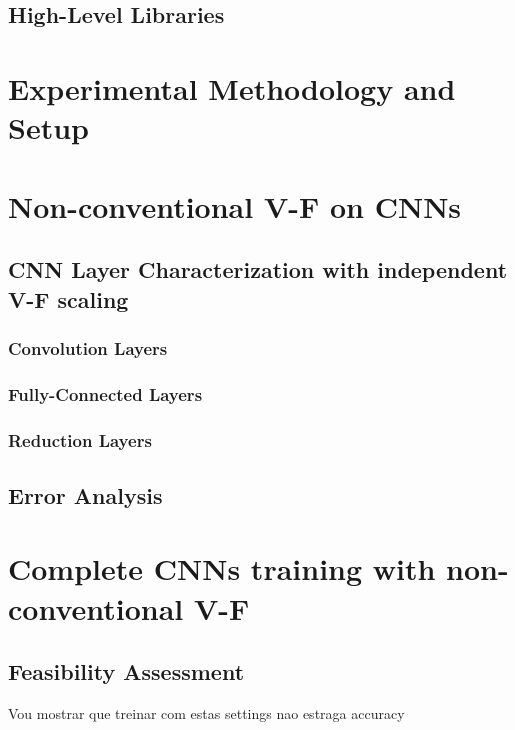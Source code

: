\subsection{High-Level Libraries}

\section{Experimental Methodology and Setup}
\label{section:methodology}

\section{Non-conventional V-F on CNNs}
\label{section:baseline}

\subsection{CNN Layer Characterization with independent V-F scaling}

\subsubsection{Convolution Layers}
\subsubsection{Fully-Connected Layers}
\subsubsection{Reduction Layers}

\subsection{Error Analysis}
\section{Complete CNNs training with non-conventional V-F}
\label{section:enhanced}

\subsection{Feasibility Assessment}
Vou mostrar que treinar com estas settings nao estraga accuracy

